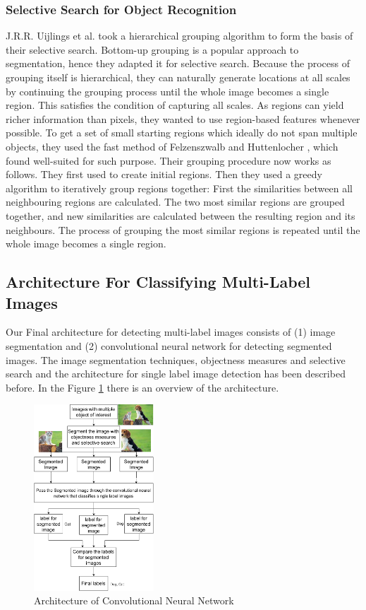 \subsubsection{Selective Search for Object Recognition}

J.R.R. Uijlings et al. \cite{2} took a hierarchical grouping algorithm to form the basis of their
selective search. Bottom-up grouping is a popular approach to segmentation, hence they adapted it for selective search. Because
the process of grouping itself is hierarchical, they can naturally generate locations at all scales by continuing the grouping process until
the whole image becomes a single region. This satisfies the condition of capturing all scales.
As regions can yield richer information than pixels, they wanted to
use region-based features whenever possible. To get a set of small
starting regions which ideally do not span multiple objects, they used the fast method of Felzenszwalb and Huttenlocher \cite{7}, which
found well-suited for such purpose.
Their grouping procedure now works as follows. They first used \cite{7}
to create initial regions. Then they used a greedy algorithm to iteratively group regions together: First the similarities between all
neighbouring regions are calculated. The two most similar regions
are grouped together, and new similarities are calculated between
the resulting region and its neighbours. The process of grouping
the most similar regions is repeated until the whole image becomes
a single region.


\subsection{Architecture For Classifying Multi-Label Images}

Our Final architecture for detecting multi-label images consists of (1) image segmentation and (2) convolutional neural network for detecting segmented images. The image segmentation techniques, objectness measures and selective search and the architecture for single label image detection has been described before. In the Figure \ref{finalarch} there is an overview of the architecture.

\begin{figure}[!htb]
  \centering
  \includegraphics[width=0.4\textwidth]{images/finalarch.png}
  \caption{Architecture of Convolutional Neural Network}\label{finalarch}
\end{figure}

